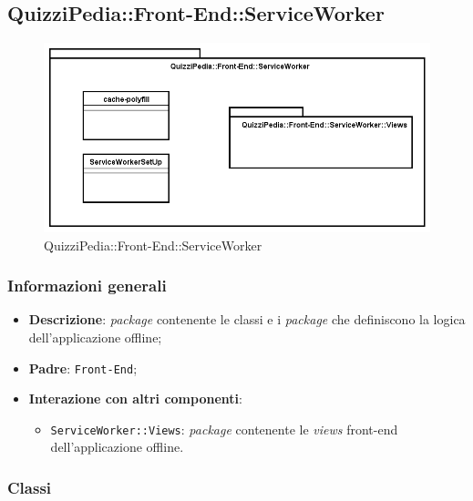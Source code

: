 \newpage
\subsection{QuizziPedia::Front-End::ServiceWorker}


\begin{figure} [ht]
	\centering
	\includegraphics[scale=0.42]{UML/Package/QuizziPedia_Front-End_ServiceWorker.png}
	\caption{QuizziPedia::Front-End::ServiceWorker}
\end{figure} \FloatBarrier

\subsubsection{Informazioni generali}
\begin{itemize}
	\item \textbf{Descrizione}:	\textit{package} contenente le classi e i \textit{package} che definiscono la logica dell'applicazione offline;
	\item \textbf{Padre}: \texttt{Front-End};
	\item \textbf{Interazione con altri componenti}:
	\begin{itemize}
		\item \texttt{ServiceWorker::Views}: \textit{package} contenente le \textit{views} front-end dell'applicazione offline.
	\end{itemize} 
\end{itemize}
\subsubsection{Classi}




